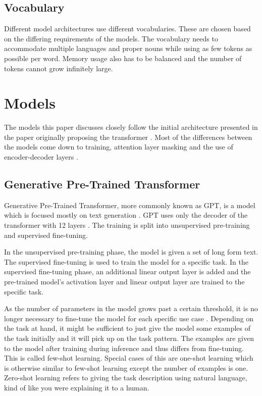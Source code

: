 \documentclass[twoside]{article}
\begin{document}
\subsection{Vocabulary}
Different model architectures use different vocabularies. These are chosen based
on the differing requirements of the models. The vocabulary needs to accommodate 
multiple languages and proper nouns while using as few tokens as possible per word.
Memory usage also has to be balanced and the number of tokens cannot grow infinitely
large. 

\section{Models}

The models this paper discusses closely follow the initial architecture
presented in the paper originally proposing the transformer 
\cite{vaswani_attention_2017}. Most of the differences between 
the models come down to training, attention layer masking and the use of encoder-decoder layers
\cite{raffel_exploring_2020}.


\subsection{Generative Pre-Trained Transformer}
Generative Pre-Trained Transformer, more commonly known as GPT, is a model
which is focused mostly on text generation \cite{brown_language_2020}. 
GPT uses only the decoder of the transformer with 12 layers 
\cite{radford_improving_nodate}. The training is split into unsupervised
pre-training and supervised fine-tuning. 

In the unsupervised pre-training phase, the model is given a set of long form text. 
The supervised fine-tuning is used to train the
model for a specific task. In the supervised fine-tuning phase, an additional linear
output layer is added
and the pre-trained model's activation layer and linear output layer are trained
to the specific task. \cite{radford_improving_nodate}

As the number of parameters in the model grows past a certain threshold, it
is no longer necessary to fine-tune the model for each specific use case 
\cite{brown_language_2020}. Depending on the task at hand, it might be sufficient
to just give the model some examples of the task initially and it will pick up on the task pattern. The examples are given to
the model after training during inference and thus differs from fine-tuning. 
This is called few-shot learning. Special cases of this are one-shot learning which is
otherwise similar to few-shot learning except the number of examples is one.
Zero-shot learning refers to giving the task description using natural language,
kind of like you were explaining it to a human. 
\end{document}
